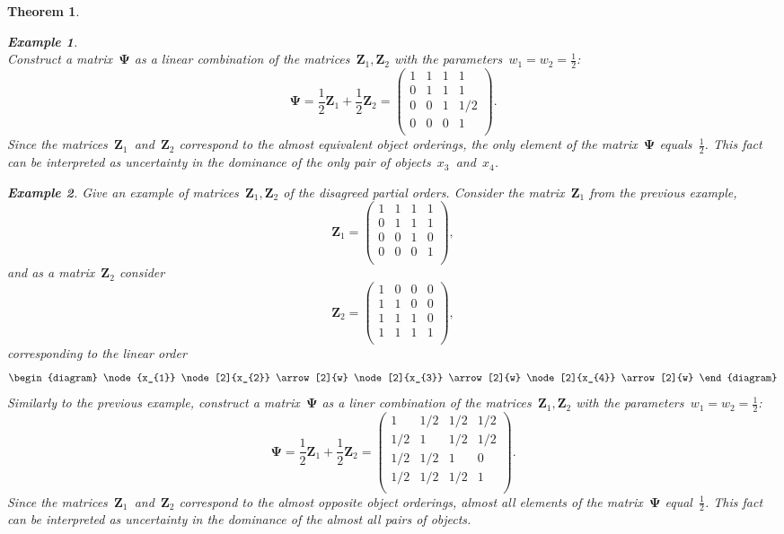 \documentclass[12pt,preprint]{elsarticle}
\newcommand{\bZ}{\mathbf{Z}}
\newcommand{\bPsi}{\boldsymbol{\Psi}}
\newtheorem{Theorem}{Theorem}
\newtheorem{Ex}{Example}
\begin{document}
\begin{Theorem}
\begin{Ex}
\[\]
Construct a matrix~$\bPsi$ as a linear combination of the matrices~$\bZ_1,\bZ_2$ with the parameters~$w_1=w_2=\frac{1}{2}$:
\[
\bPsi=\frac{1}{2}\bZ_1+\frac{1}{2}\bZ_2=
\begin{pmatrix}
1 & 1 & 1 & 1 \\
0 & 1 & 1 & 1 \\
0 & 0 & 1 & 1/2 \\
0 & 0 & 0 & 1 \\
\end{pmatrix}.
\]
Since the matrices~$\bZ_1$~and~$\bZ_2$ correspond to the almost equivalent object orderings, the only element of the matrix~$\bPsi$ equals~$\frac{1}{2}$. This fact can be interpreted as uncertainty in the dominance of the only pair of objects~$x_3$~and~$x_4$.
\end{Ex}

\begin{Ex} Give an example of matrices~$\bZ_1,\bZ_2$ of the disagreed partial orders. Consider the matrix~$\bZ_1$ from the previous example,
\[
\bZ_1=
\begin{pmatrix}
1 & 1 & 1 & 1 \\
0 & 1 & 1 & 1 \\
0 & 0 & 1 & 0 \\
0 & 0 & 0 & 1 \\
\end{pmatrix},
\]
and as a matrix~$\bZ_2$ consider
\[
\bZ_2=
\begin{pmatrix}
1 & 0 & 0 & 0 \\
1 & 1 & 0 & 0 \\
1 & 1 & 1 & 0 \\
1 & 1 & 1 & 1 \\
\end{pmatrix},
\]
corresponding to the linear order
\[
\begin{diagram}
\node{x_{1}}
\node[2]{x_{2}} \arrow[2]{w}
\node[2]{x_{3}} \arrow[2]{w}
\node[2]{x_{4}} \arrow[2]{w}
\end{diagram}
\]
Similarly to the previous example, construct a matrix~$\bPsi$ as a liner combination of the matrices~$\bZ_1,\bZ_2$ with the parameters~$w_1=w_2=\frac{1}{2}$:
\[
\bPsi=\frac{1}{2}\bZ_1+\frac{1}{2}\bZ_2=
\begin{pmatrix}
1 & 1/2 & 1/2 & 1/2 \\
1/2 & 1 & 1/2 & 1/2 \\
1/2 & 1/2 & 1 & 0 \\
1/2 & 1/2 & 1/2 & 1 \\
\end{pmatrix}.
\]
Since the matrices~$\bZ_1$~and~$\bZ_2$ correspond to the almost opposite object orderings, almost all elements of the matrix~$\bPsi$ equal~$\frac{1}{2}$. This fact can be interpreted as uncertainty in the dominance of the almost all pairs of objects.
\end{Ex}


\end{Theorem}
\end{document}
